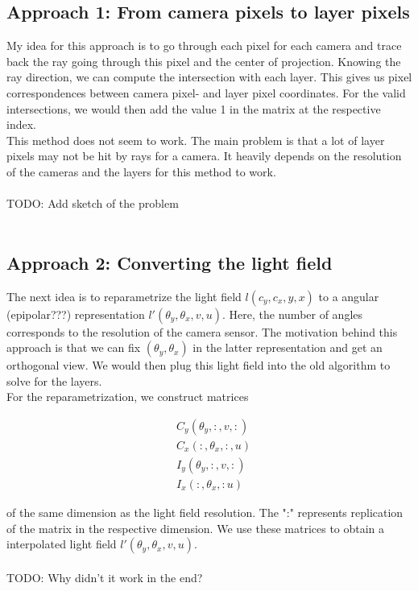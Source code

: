 \documentclass[11pt,a4paper,titlepage]{article}
\begin{document}
\subsection{Approach 1: From camera pixels to layer pixels}
My idea for this approach is to go through each pixel for each camera and trace back the ray going through this pixel and the center of projection. Knowing the ray direction, we can compute the intersection with each layer. This gives us pixel correspondences between camera pixel- and layer pixel coordinates. For the valid intersections, we would then add the value 1 in the matrix at the respective index. 
\\
This method does not seem to work. The main problem is that a lot of layer pixels may not be hit by rays for a camera. It heavily depends on the resolution of the cameras and the layers for this method to work.
\\\\ TODO: Add sketch of the problem \\\\

\subsection{Approach 2: Converting the light field}
The next idea is to reparametrize the light field $l \left( c_y, c_x, y, x \right)$ to a angular (epipolar???) representation $l' \left( \theta_y, \theta_x, v, u \right)$. Here, the number of angles corresponds to the resolution of the camera sensor. The motivation behind this approach is that we can fix 
$\left( \theta_y, \theta_x \right)$ in the latter representation and get an orthogonal view. We would then plug this light field into the old algorithm to solve for the layers.
\\
For the reparametrization, we construct matrices

\begin{align*}
	& C_y \left( \theta_y, :, v, : \right) \\
	& C_x \left( :, \theta_x, :, u \right) \\
	& I_y \left(\theta_y, :, v, : \right) \\
	& I_x \left( :, \theta_x, : u \right) 
\end{align*}

of the same dimension as the light field resolution. The ":" represents replication of the matrix in the respective dimension. We use these matrices to obtain a interpolated light field $l' \left( \theta_y, \theta_x, v, u \right)$.
\\\\ TODO: Why didn't it work in the end? 
\end{document}
